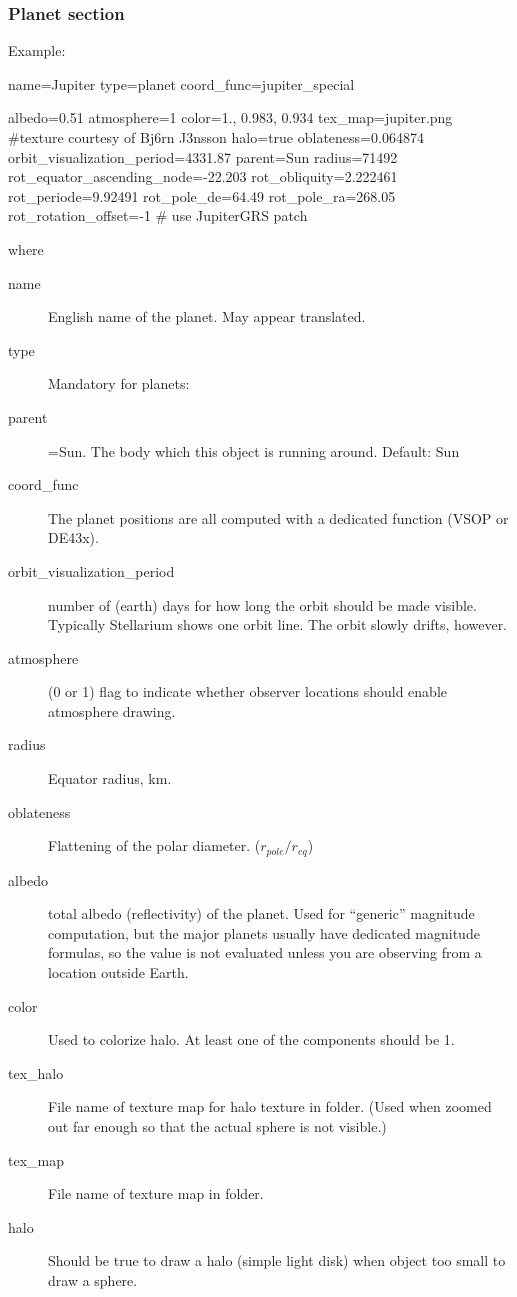 \subsubsection{Planet section}
\label{sec:ssystem.ini:Planet}

Example:
\begin{configfile}
[jupiter]
name=Jupiter
type=planet  
coord_func=jupiter_special

albedo=0.51
atmosphere=1
color=1., 0.983, 0.934
tex_map=jupiter.png #texture courtesy of Bj\xf6rn J\xf3nsson
halo=true
oblateness=0.064874
orbit_visualization_period=4331.87
parent=Sun
radius=71492
rot_equator_ascending_node=-22.203
rot_obliquity=2.222461
rot_periode=9.92491
rot_pole_de=64.49
rot_pole_ra=268.05
rot_rotation_offset=-1 # use JupiterGRS patch
\end{configfile}


where 
\begin{description}
\item[name] English name of the planet. May appear translated. 
\item[type] Mandatory for planets: \value{planet}
\item[parent]=Sun. The body which this object is running around. Default: Sun
\item[coord\_func] The planet positions are all computed with a dedicated function (VSOP or DE43x). 
\item[orbit\_visualization\_period] number of (earth) days for how
  long the orbit should be made visible. Typically Stellarium shows
  one orbit line. The orbit slowly drifts, however.

\item[atmosphere] (0 or 1) flag to indicate whether observer locations should enable atmosphere drawing.

\item[radius] Equator radius, km.
\item[oblateness] Flattening of the polar diameter. ($r_{pole}/r_{eq}$)
\item[albedo] total albedo (reflectivity) of the planet. Used for ``generic''
  magnitude computation, but the major planets usually have dedicated
  magnitude formulas, so the value is not evaluated unless you are
  observing from a location outside Earth.
\item[color] Used to colorize halo. At least one of the components should be 1.
\item[tex\_halo] File name of texture map for halo texture in
   folder. (Used when zoomed out far enough so that the
  actual sphere is not visible.)
\item[tex\_map] File name of texture map in  folder.
\item[halo] Should be true to draw a halo (simple light disk) when object too small to draw a sphere.
\end{description}

